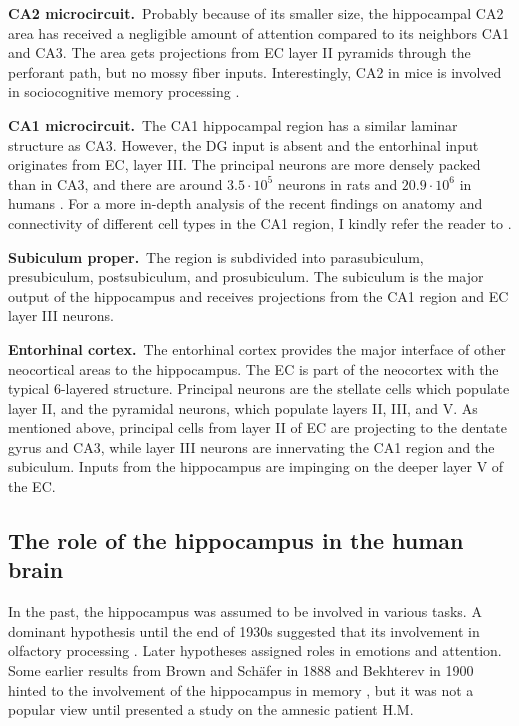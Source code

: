     \textbf{CA2 microcircuit.}\, Probably because of its smaller size, the
    hippocampal CA2 area has received a negligible amount of attention compared
    to its neighbors CA1 and CA3. The area gets projections from EC layer II
    pyramids through the perforant path, but no mossy fiber inputs.
    Interestingly, CA2 in mice is involved in sociocognitive memory processing
    \citep{Hitti2014}.

    \textbf{CA1 microcircuit.}\,
    The CA1 hippocampal region has a similar laminar structure as CA3.
    However, the DG input is absent and the entorhinal input originates from
    EC, layer III. The principal neurons are more densely packed than in CA3,
    and there are around $3.5\cdot 10^5$ neurons in rats \citep{West1991} and
    $20.9 \cdot 10^6$ in humans \citep{Simic1997}. For a more in-depth analysis
    of the recent findings on anatomy and connectivity of different cell types
    in the CA1 region, I kindly refer the reader to \cite{Bezaire2013}.

    \textbf{Subiculum proper.}\,
    The region is subdivided into parasubiculum, presubiculum, postsubiculum,
    and prosubiculum. The subiculum is the major output of the hippocampus and
    receives projections from the CA1 region and EC layer III neurons.

    \textbf{Entorhinal cortex.}\,
    The entorhinal cortex provides the major interface of other neocortical
    areas to the hippocampus. The EC is part of the neocortex with the typical
    6-layered structure. Principal neurons are the stellate cells which
    populate layer II, and the pyramidal neurons, which populate layers II,
    III, and V.  As mentioned above, principal cells from layer II of EC are
    projecting to the dentate gyrus and CA3, while layer III neurons are
    innervating the CA1 region and the subiculum. Inputs from the hippocampus
    are impinging on the deeper layer V of the EC.


  \subsection{The role of the hippocampus in the human brain}
    In the past, the hippocampus was assumed to be involved in various tasks. A
    dominant hypothesis until the end of 1930s suggested that its involvement
    in olfactory processing \citep{Andersen2007}. Later hypotheses assigned
    roles in emotions and attention. Some earlier results from Brown and
    Sch\"{a}fer in 1888 and Bekhterev in 1900 hinted to the involvement of the
    hippocampus in memory \citep{Andersen2007}, but it was not a popular view
    until \cite{Scoville1957} presented a study on the amnesic patient H.M.

